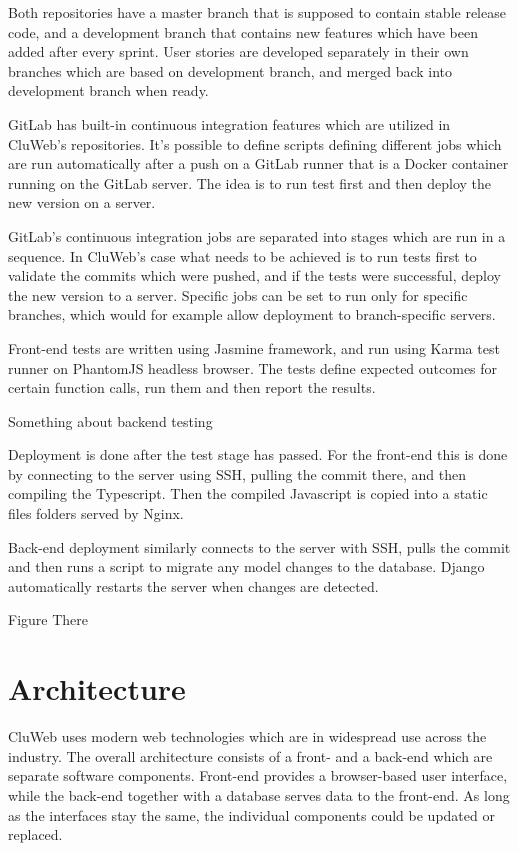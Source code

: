 Both repositories have a master branch that is supposed to contain stable release code, and a development branch that contains new features which have been added after every sprint. User stories are developed separately in their own branches which are based on development branch, and merged back into development branch when ready.

GitLab has built-in continuous integration features which are utilized in CluWeb's repositories. It's possible to define scripts defining different jobs which are run automatically after a push on a GitLab runner that is a Docker container running on the GitLab server. The idea is to run test first and then deploy the new version on a server.

GitLab's continuous integration jobs are separated into stages which are run in a sequence. In CluWeb's case what needs to be achieved is to run tests first to validate the commits which were pushed, and if the tests were successful, deploy the new version to a server. Specific jobs can be set to run only for specific branches, which would for example allow deployment to branch-specific servers.

Front-end tests are written using Jasmine framework, and run using Karma test runner on PhantomJS headless browser. The tests define expected outcomes for certain function calls, run them and then report the results.

Something about backend testing

Deployment is done after the test stage has passed. For the front-end this is done by connecting to the server using SSH, pulling the commit there, and then compiling the Typescript. Then the compiled Javascript is copied into a static files folders served by Nginx.

Back-end deployment similarly connects to the server with SSH, pulls the commit and then runs a script to migrate any model changes to the database. Django automatically restarts the server when changes are detected.

Figure There

\section{Architecture}
CluWeb uses modern web technologies which are in widespread use across the industry. The overall architecture consists of a front- and a back-end which are separate software components. Front-end provides a browser-based user interface, while the back-end together with a database serves data to the front-end. As long as the interfaces stay the same, the individual components could be updated or replaced.

